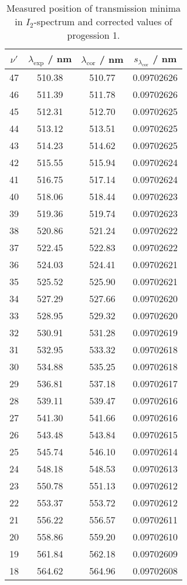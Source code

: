 \begin{table}[H]
\caption{Measured position of transmission minima in $I_2$-spectrum and corrected values of progession 1.}
\begin{center}
\begin{tabular}{|c|c|c|c|}
  \hline
  $\nu'$ & $\lambda_{\text{exp}}$ / nm & $\lambda_{\text{cor}}$ / nm & $s_{\lambda_{\text{cor}}}$ / nm \\ \hline
  47 & 510.38 & 510.77 & 0.09702626 \\ \hline
  46 & 511.39 & 511.78 & 0.09702626 \\ \hline
  45 & 512.31 & 512.70 & 0.09702625 \\ \hline
  44 & 513.12 & 513.51 & 0.09702625 \\ \hline
  43 & 514.23 & 514.62 & 0.09702625 \\ \hline
  42 & 515.55 & 515.94 & 0.09702624 \\ \hline
  41 & 516.75 & 517.14 & 0.09702624 \\ \hline
  40 & 518.06 & 518.44 & 0.09702623 \\ \hline
  39 & 519.36 & 519.74 & 0.09702623 \\ \hline
  38 & 520.86 & 521.24 & 0.09702622 \\ \hline
  37 & 522.45 & 522.83 & 0.09702622 \\ \hline
  36 & 524.03 & 524.41 & 0.09702621 \\ \hline
  35 & 525.52 & 525.90 & 0.09702621 \\ \hline
  34 & 527.29 & 527.66 & 0.09702620 \\ \hline
  33 & 528.95 & 529.32 & 0.09702620 \\ \hline
  32 & 530.91 & 531.28 & 0.09702619 \\ \hline
  31 & 532.95 & 533.32 & 0.09702618 \\ \hline
  30 & 534.88 & 535.25 & 0.09702618 \\ \hline
  29 & 536.81 & 537.18 & 0.09702617 \\ \hline
  28 & 539.11 & 539.47 & 0.09702616 \\ \hline
  27 & 541.30 & 541.66 & 0.09702616 \\ \hline
  26 & 543.48 & 543.84 & 0.09702615 \\ \hline
  25 & 545.74 & 546.10 & 0.09702614 \\ \hline
  24 & 548.18 & 548.53 & 0.09702613 \\ \hline
  23 & 550.78 & 551.13 & 0.09702612 \\ \hline
  22 & 553.37 & 553.72 & 0.09702612 \\ \hline
  21 & 556.22 & 556.57 & 0.09702611 \\ \hline
  20 & 558.86 & 559.20 & 0.09702610 \\ \hline
  19 & 561.84 & 562.18 & 0.09702609 \\ \hline
  18 & 564.62 & 564.96 & 0.09702608 \\ \hline
\end{tabular}
\end{center}
\label{tab:prog1}
\end{table}
